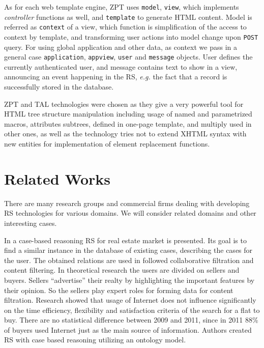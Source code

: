 \documentclass[conference,a4]{IEEEtran}
\begin{document}
As for each web template engine, ZPT uses \texttt{model}, \texttt{view}, which implements \emph{controller} functions as well, and \texttt{template} to generate HTML content.  Model is referred as \texttt{context} of a view, which function is simplification of the access to context by template, and transforming user actions into model change upon \texttt{POST} query.  For using global application and other data, as context we pass in a general case \texttt{application}, \texttt{appview}, \texttt{user} and \texttt{message} objects.  User defines the currently authenticated user, and message contains text to show in a view, announcing an event happening in the RS, \emph{e.g.} the fact that a record is successfully stored in the database.

ZPT and TAL technologies were chosen as they give a very powerful tool for HTML tree structure manipulation including usage of named and parametrized macros, attributes subtrees, defined in one-page template, and multiply used in other ones, as well as the technology tries not to extend XHTML syntax with new entities for implementation of element replacement functions.

\section{Related Works}

There are many research groups and commercial firms dealing with developing RS technologies for various domains.  We will consider related domains and other interesting cases.

In \cite{br22} a case-based reasoning RS for real estate market is presented.  Its goal is to find a similar instance in the database of existing cases, describing the cases for the user.  The obtained relations are used in followed collaborative filtration and content filtering.  In theoretical research \cite{br20} the users are divided on sellers and buyers.  Sellers ``advertise'' their realty by highlighting the important features by their opinion.  So the sellers play expert roles for forming data for content filtration.  Research \cite{br23} showed that usage of Internet does not influence significantly on the time efficiency, flexibility and satisfaction criteria of the search for a flat to buy.  There are no statistical difference between 2009 and 2011, since in 2011 88\% of buyers used Internet just as the main source of information.  Authors created RS with case based reasoning utilizing an ontology model.
\end{document}
